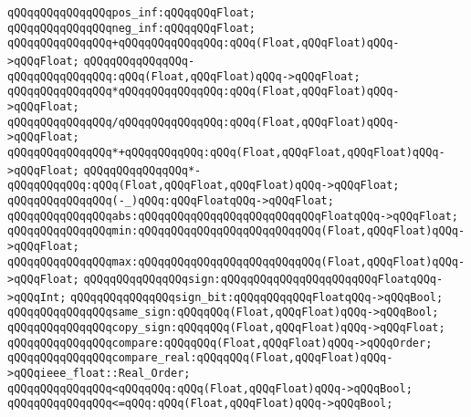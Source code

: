 \verb|qQQqqQQqqQQqqQQqpos_inf:qQQqqQQqFloat;|\newline
\verb|qQQqqQQqqQQqqQQqneg_inf:qQQqqQQqFloat;|\newline
\newline
\verb|qQQqqQQqqQQqqQQq+qQQqqQQqqQQqqQQq:qQQq(Float,qQQqFloat)qQQq->qQQqFloat;|\newline
\verb|qQQqqQQqqQQqqQQq-qQQqqQQqqQQqqQQq:qQQq(Float,qQQqFloat)qQQq->qQQqFloat;|\newline
\verb|qQQqqQQqqQQqqQQq*qQQqqQQqqQQqqQQq:qQQq(Float,qQQqFloat)qQQq->qQQqFloat;|\newline
\verb|qQQqqQQqqQQqqQQq/qQQqqQQqqQQqqQQq:qQQq(Float,qQQqFloat)qQQq->qQQqFloat;|\newline
\verb|qQQqqQQqqQQqqQQq*+qQQqqQQqqQQq:qQQq(Float,qQQqFloat,qQQqFloat)qQQq->qQQqFloat;|\newline
\verb|qQQqqQQqqQQqqQQq*-qQQqqQQqqQQq:qQQq(Float,qQQqFloat,qQQqFloat)qQQq->qQQqFloat;|\newline
\verb|qQQqqQQqqQQqqQQq(-_)qQQq:qQQqFloatqQQq->qQQqFloat;|\newline
\newline
\verb|qQQqqQQqqQQqqQQqabs:qQQqqQQqqQQqqQQqqQQqqQQqqQQqFloatqQQq->qQQqFloat;|\newline
\verb|qQQqqQQqqQQqqQQqmin:qQQqqQQqqQQqqQQqqQQqqQQqqQQq(Float,qQQqFloat)qQQq->qQQqFloat;|\newline
\verb|qQQqqQQqqQQqqQQqmax:qQQqqQQqqQQqqQQqqQQqqQQqqQQq(Float,qQQqFloat)qQQq->qQQqFloat;|\newline
\newline
\verb|qQQqqQQqqQQqqQQqsign:qQQqqQQqqQQqqQQqqQQqqQQqFloatqQQq->qQQqInt;|\newline
\verb|qQQqqQQqqQQqqQQqsign_bit:qQQqqQQqqQQqFloatqQQq->qQQqBool;|\newline
\verb|qQQqqQQqqQQqqQQqsame_sign:qQQqqQQq(Float,qQQqFloat)qQQq->qQQqBool;|\newline
\verb|qQQqqQQqqQQqqQQqcopy_sign:qQQqqQQq(Float,qQQqFloat)qQQq->qQQqFloat;|\newline
\newline
\verb|qQQqqQQqqQQqqQQqcompare:qQQqqQQq(Float,qQQqFloat)qQQq->qQQqOrder;|\newline
\verb|qQQqqQQqqQQqqQQqcompare_real:qQQqqQQq(Float,qQQqFloat)qQQq->qQQqieee_float::Real_Order;|\newline
\newline
\verb|qQQqqQQqqQQqqQQq<qQQqqQQq:qQQq(Float,qQQqFloat)qQQq->qQQqBool;|\newline
\verb|qQQqqQQqqQQqqQQq<=qQQq:qQQq(Float,qQQqFloat)qQQq->qQQqBool;|\newline
